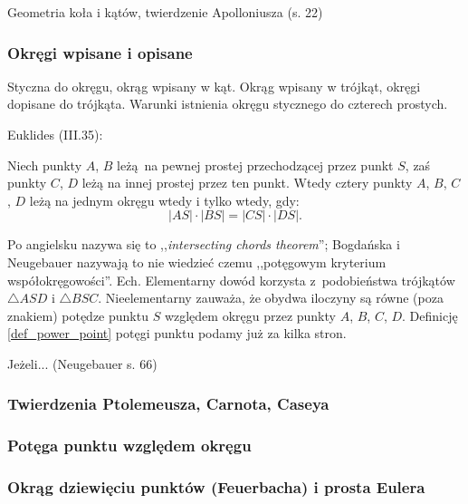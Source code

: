 Geometria koła i kątów, twierdzenie Apolloniusza (s. 22)

\subsubsection{Okręgi wpisane i opisane}
Styczna do okręgu, okrąg wpisany w kąt.
Okrąg wpisany w trójkąt, okręgi dopisane do trójkąta.
Warunki istnienia okręgu stycznego do czterech prostych.

Euklides (III.35):

\begin{proposition}
    \label{prop_intersecting_chords}
	Niech punkty $A$, $B$ leżą na pewnej prostej przechodzącej przez punkt $S$, zaś punkty $C$, $D$ leżą na innej prostej przez ten punkt.
	Wtedy cztery punkty $A$, $B$, $C$, $D$ leżą na jednym okręgu wtedy i tylko wtedy, gdy:
	\begin{equation}
		|AS| \cdot |BS| = |CS| \cdot |DS|.
	\end{equation}
\end{proposition}

Po angielsku nazywa się to ,,\emph{intersecting chords theorem}''; Bogdańska i Neugebauer nazywają to nie wiedzieć czemu ,,potęgowym kryterium współokręgowości''.
Ech.
Elementarny dowód korzysta z~podobieństwa trójkątów $\triangle ASD$ i $\triangle BSC$.
Nieelementarny zauważa, że obydwa iloczyny są równe (poza znakiem) potędze punktu $S$ względem okręgu przez punkty $A$, $B$, $C$, $D$.
Definicję \ref{def_power_point} potęgi punktu podamy już za kilka stron.

\begin{proposition}
	Jeżeli... (Neugebauer s. 66)
\end{proposition}

\subsubsection{Twierdzenia Ptolemeusza, Carnota, Caseya}


\subsubsection{Potęga punktu względem okręgu}


\subsubsection{Okrąg dziewięciu punktów (Feuerbacha) i prosta Eulera}


